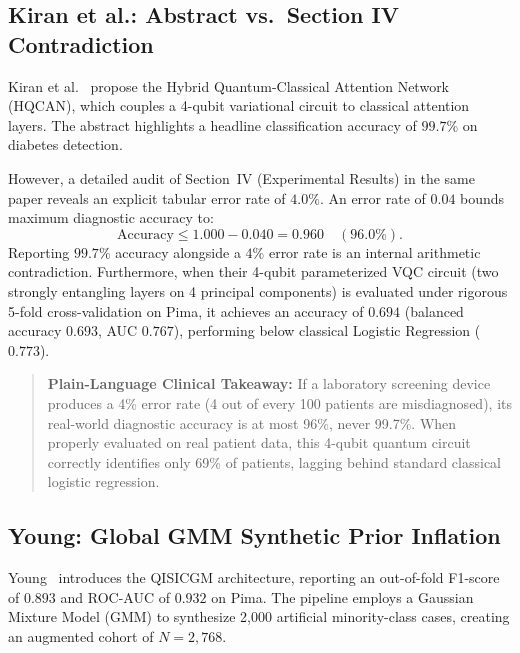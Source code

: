 \documentclass[journal,twocolumn]{IEEEtran}
\begin{document}
\subsection{Kiran et al.: Abstract vs.\ Section IV Contradiction}
Kiran et al.~\cite{kiran2025} propose the Hybrid Quantum-Classical Attention Network (HQCAN), which couples a 4-qubit variational circuit to classical attention layers. The abstract highlights a headline classification accuracy of $99.7\%$ on diabetes detection.

However, a detailed audit of Section~IV (Experimental Results) in the same paper reveals an explicit tabular error rate of $4.0\%$. An error rate of $0.04$ bounds maximum diagnostic accuracy to:
\begin{equation}
\text{Accuracy} \le 1.000 - 0.040 = 0.960 \quad (96.0\%).
\end{equation}
Reporting $99.7\%$ accuracy alongside a $4\%$ error rate is an internal arithmetic contradiction. Furthermore, when their 4-qubit parameterized VQC circuit (two strongly entangling layers on 4 principal components) is evaluated under rigorous 5-fold cross-validation on Pima, it achieves an accuracy of $0.694$ (balanced accuracy $0.693$, AUC $0.767$), performing below classical Logistic Regression ($0.773$).

\begin{quote}
\small
\textbf{Plain-Language Clinical Takeaway:} If a laboratory screening device produces a 4\% error rate (4 out of every 100 patients are misdiagnosed), its real-world diagnostic accuracy is at most 96\%, never 99.7\%. When properly evaluated on real patient data, this 4-qubit quantum circuit correctly identifies only 69\% of patients, lagging behind standard classical logistic regression.
\end{quote}

\subsection{Young: Global GMM Synthetic Prior Inflation}
Young~\cite{young2025} introduces the QISICGM architecture, reporting an out-of-fold F1-score of $0.893$ and ROC-AUC of $0.932$ on Pima. The pipeline employs a Gaussian Mixture Model (GMM) to synthesize 2,000 artificial minority-class cases, creating an augmented cohort of $N=2{,}768$.
\end{document}
